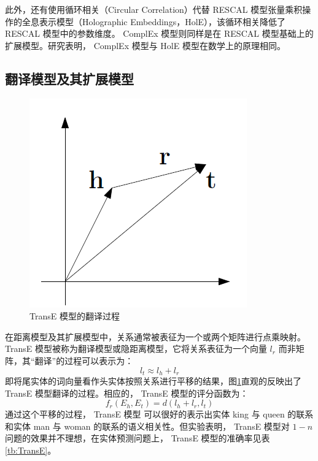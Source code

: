 \documentclass{llncs}
\begin{document}
此外，还有使用循环相关（Circular Correlation）代替 RESCAL 模型张量乘积操作的全息表示模型（Holographic Embeddings，HolE）\cite{DBLP:conf/aaai/NickelRP16}，该循环相关降低了 RESCAL 模型中的参数维度。 ComplEx 模型\cite{DBLP:conf/icml/TrouillonWRGB16}则同样是在 RESCAL 模型基础上的扩展模型。研究\cite{DBLP:conf/acl/HayashiS17}表明， ComplEx 模型与 HolE 模型在数学上的原理相同。

\subsection{翻译模型及其扩展模型}

\begin{figure}
	\centering
	\includegraphics[width=0.5\columnwidth]{figures/TransE.png}
	\caption{ TransE 模型的翻译过程}
	\label{fg:TransE}
\end{figure}

在距离模型及其扩展模型中，关系通常被表征为一个或两个矩阵进行点乘映射。 TransE 模型\cite{DBLP:conf/nips/BordesUGWY13}被称为翻译模型或隐距离模型，它将关系表征为一个向量 $l_r$ 而非矩阵，其“翻译”的过程可以表示为：
\begin{displaymath}
l_t\approx l_h+l_r
\end{displaymath}
即将尾实体的词向量看作头实体按照关系进行平移的结果，图\ref{fg:TransE}直观的反映出了 TransE 模型翻译的过程。相应的， TransE 模型的评分函数为：
\begin{displaymath}
f_r(E_h,E_t)=d(l_h+l_r,l_t)
\end{displaymath}
通过这个平移的过程， TransE 模型 可以很好的表示出实体 king 与 queen 的联系和实体 man 与 woman 的联系的语义相关性。但实验\cite{DBLP:conf/nips/BordesUGWY13}表明， TransE 模型对 $1-n$ 问题的效果并不理想，在实体预测问题上， TransE 模型的准确率见表\ref{tb:TransE}。
\end{document}
